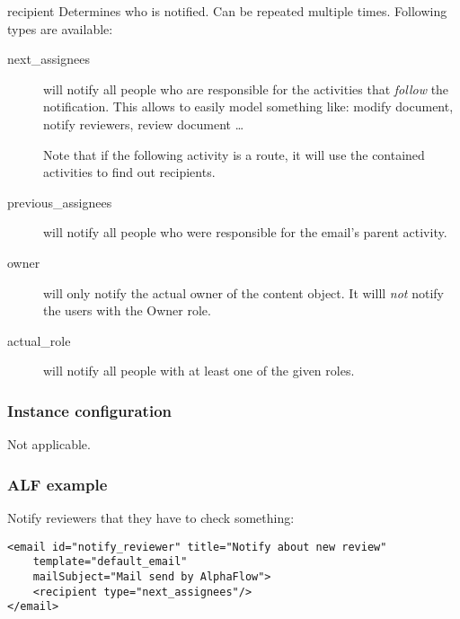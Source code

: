     \begin{memberdesc}{recipient}
        Determines who is notified. Can be repeated multiple times. Following types are available:

        \begin{description}
                
            \item[next\_assignees] will notify all people who are responsible
                for the activities that \emph{follow} the notification. This
                allows to easily model something like: modify document, notify
                reviewers, review document \ldots

                Note that if the following activity is a route, it will use
                the contained activities to find out recipients.

            \item[previous\_assignees] will notify all people who were
              responsible for the email's parent activity.

                
            \item[owner] will only notify the actual owner of the content
              object. It willl \emph{not} notify the users with the Owner
              role.
                
            \item[actual\_role] will notify all people with at least one of 
                the given roles.

        \end{description}
    \end{memberdesc}

  \subsubsection{Instance configuration}

  Not applicable.
  
  \subsubsection{ALF example}

  Notify reviewers that they have to check something:

\begin{verbatim}
<email id="notify_reviewer" title="Notify about new review"
    template="default_email"
    mailSubject="Mail send by AlphaFlow">
    <recipient type="next_assignees"/>
</email>
\end{verbatim}

